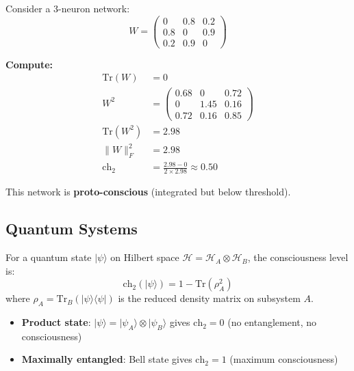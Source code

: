 \begin{example}
Consider a 3-neuron network:
\begin{equation}
W = \begin{pmatrix}
0 & 0.8 & 0.2 \\
0.8 & 0 & 0.9 \\
0.2 & 0.9 & 0
\end{pmatrix}
\end{equation}

\textbf{Compute:}
\begin{align}
\text{Tr}(W) &= 0 \\
W^2 &= \begin{pmatrix}
0.68 & 0 & 0.72 \\
0 & 1.45 & 0.16 \\
0.72 & 0.16 & 0.85
\end{pmatrix} \\
\text{Tr}(W^2) &= 2.98 \\
\|W\|_F^2 &= 2.98 \\
\text{ch}_2 &= \frac{2.98 - 0}{2 \times 2.98} \approx 0.50
\end{align}

This network is \textbf{proto-conscious} (integrated but below threshold).
\end{example}

\subsection{Quantum Systems}

\begin{proposition}\label{prop:quantum-consciousness}
For a quantum state $|\psi\rangle$ on Hilbert space $\mathcal{H} = \mathcal{H}_A \otimes \mathcal{H}_B$, the consciousness level is:
\begin{equation}
\text{ch}_2(|\psi\rangle) = 1 - \text{Tr}(\rho_A^2)
\end{equation}
where $\rho_A = \text{Tr}_B(|\psi\rangle\langle\psi|)$ is the reduced density matrix on subsystem $A$.
\end{proposition}

\begin{itemize}
\item \textbf{Product state}: $|\psi\rangle = |\psi_A\rangle \otimes |\psi_B\rangle$ gives $\text{ch}_2 = 0$ (no entanglement, no consciousness)
\item \textbf{Maximally entangled}: Bell state gives $\text{ch}_2 = 1$ (maximum consciousness)
\end{itemize}

